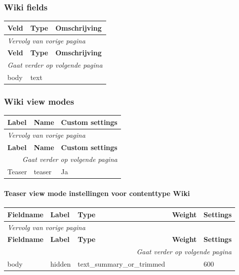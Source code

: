 \subsubsection{Wiki fields}
  \begin{longtable}{| p{5.00cm}|p{5.00cm}|p{5.00cm}|}
  \hline
  \rowcolor{tableheader}
  \textbf{Veld} & \textbf{Type} & \textbf{Omschrijving}  \tabularnewline
  \hline
\endfirsthead
\multicolumn{3}{l}{\textit{Vervolg van vorige pagina}} \\
\hline
\rowcolor{tableheader}
  \textbf{Veld} & \textbf{Type} & \textbf{Omschrijving}  \tabularnewline
  \hline
\hline
\endhead
\multicolumn{3}{r}{\textit{Gaat verder op volgende pagina}} \\
\endfoot
\hline
\endlastfoot
  body & text &   \tabularnewline
  \hline
  \end{longtable}

\subsubsection{Wiki view modes}
  \begin{longtable}{| p{5.00cm}|p{5.00cm}|p{5.00cm}|}
  \hline
  \rowcolor{tableheader}
  \textbf{Label} & \textbf{Name} & \textbf{Custom settings}  \tabularnewline
  \hline
\endfirsthead
\multicolumn{3}{l}{\textit{Vervolg van vorige pagina}} \\
\hline
\rowcolor{tableheader}
  \textbf{Label} & \textbf{Name} & \textbf{Custom settings}  \tabularnewline
  \hline
\hline
\endhead
\multicolumn{3}{r}{\textit{Gaat verder op volgende pagina}} \\
\endfoot
\hline
\endlastfoot
  Teaser & teaser & Ja  \tabularnewline
  \hline
  \end{longtable}

\paragraph{Teaser view mode instellingen voor contenttype Wiki }

  \begin{longtable}{| p{3.00cm}|p{3.00cm}|p{3.00cm}|p{3.00cm}|p{3.00cm}|}
  \hline
  \rowcolor{tableheader}
  \textbf{Fieldname} & \textbf{Label} & \textbf{Type} & \textbf{Weight} & \textbf{Settings}  \tabularnewline
  \hline
\endfirsthead
\multicolumn{5}{l}{\textit{Vervolg van vorige pagina}} \\
\hline
\rowcolor{tableheader}
  \textbf{Fieldname} & \textbf{Label} & \textbf{Type} & \textbf{Weight} & \textbf{Settings}  \tabularnewline
  \hline
\hline
\endhead
\multicolumn{5}{r}{\textit{Gaat verder op volgende pagina}} \\
\endfoot
\hline
\endlastfoot
  body & hidden & text\_summary\_or\_trimmed &   & 600  \tabularnewline
  \hline
  \end{longtable}

